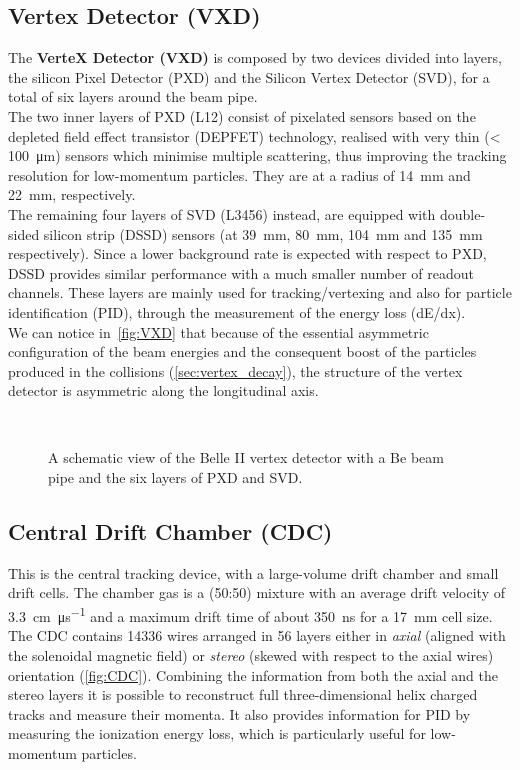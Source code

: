 \subsection{Vertex Detector (VXD)}\label{sec:VXD}


The \textbf{VerteX Detector (VXD)} is composed by two devices divided into layers, the silicon Pixel Detector (PXD) and the Silicon Vertex Detector (SVD), for a total of six layers around the beam pipe.\\
The two inner layers of PXD (L12) consist of pixelated sensors based on the depleted field effect transistor (DEPFET) technology, realised with very thin (< \SI{100}{\micro m}) sensors which minimise multiple scattering, thus improving the tracking resolution for low-momentum particles. They are at a radius of \SI{14}{mm} and \SI{22}{mm}, respectively. \\
The remaining four layers of SVD (L3456) instead, are equipped with double-sided silicon strip (DSSD) sensors (at \SI{39}{mm}, \SI{80}{mm}, \SI{104}{mm} and \SI{135}{mm} respectively). Since a lower background rate is expected with respect to PXD, DSSD provides similar performance with a much smaller number of readout channels.
These layers are mainly used for tracking/vertexing and also for particle identification (PID), through the measurement of the energy loss (dE/dx).\\

We can notice in~\autoref{fig:VXD} that because of the essential asymmetric configuration of the beam energies and the consequent boost of the particles produced in the collisions (\autoref{sec:vertex_decay}), the structure of the vertex detector is asymmetric along the longitudinal axis.

\begin{figure}[h!]
\centering
{}\quad
{}\\
\caption{A schematic view of the Belle II vertex detector with a Be beam pipe and the six layers of PXD and SVD.}
\label{fig:VXD}
\end{figure}


\subsection{Central Drift Chamber (CDC)}

This is the central tracking device, with a large-volume drift chamber and small drift cells. The chamber gas is a  (50:50) mixture with an average drift velocity of \SI{3.3}{\centi\meter.\micro\second^{-1}} and a maximum drift time of about \SI{350}{\nano s} for a \SI{17}{mm} cell size.\\
The CDC contains 14336 wires arranged in 56 layers either in \emph{axial}  (aligned with the solenoidal magnetic field) or \emph{stereo} (skewed with respect to the axial wires) orientation (\autoref{fig:CDC}). 
Combining the information from both the axial and the stereo layers it is possible to reconstruct full three-dimensional helix charged tracks and measure their momenta.
It also provides information for PID by measuring the ionization energy loss, which is particularly useful for low-momentum particles.

